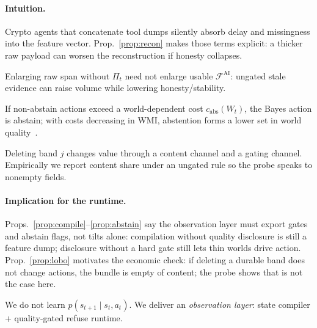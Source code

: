 \documentclass[sigconf,anonymous]{acmart}
\theoremstyle{acmdefinition}%
\theoremstyle{acmplain}%
\begin{document}
\paragraph{Intuition.}
Crypto agents that concatenate tool dumps silently absorb delay and missingness into the feature vector. Prop.~\ref{prop:recon} makes those terms explicit: a thicker raw payload can worsen the reconstruction if honesty collapses.

\begin{proposition}
\label{prop:compile}
Enlarging raw span without \(\Pi_t\) need not enlarge usable \(\mathcal{F}^{\mathrm{AI}}\): ungated stale evidence can raise volume while lowering honesty/stability.
\end{proposition}

\begin{proposition}
\label{prop:abstain}
If non-abstain actions exceed a world-dependent cost \(c_{\mathrm{abs}}(W_t)\), the Bayes action is abstain; with costs decreasing in WMI, abstention forms a lower set in world quality~\cite{elyaniv2010}.
\end{proposition}

\begin{proposition}
\label{prop:lobo}
Deleting band \(j\) changes value through a content channel and a gating channel. Empirically we report content share under an ungated rule so the probe speaks to nonempty fields.
\end{proposition}

\paragraph{Implication for the runtime.}
Props.~\ref{prop:compile}--\ref{prop:abstain} say the observation layer must export gates and abstain flags, not tilts alone: compilation without quality disclosure is still a feature dump; disclosure without a hard gate still lets thin worlds drive action. Prop.~\ref{prop:lobo} motivates the economic check: if deleting a durable band does not change actions, the bundle is empty of content; the probe shows that is not the case here.

\begin{remark}
We do not learn \(p(s_{t+1}\mid s_t,a_t)\). We deliver an \emph{observation layer}: state compiler + quality-gated refuse runtime.
\end{remark}
\end{document}
